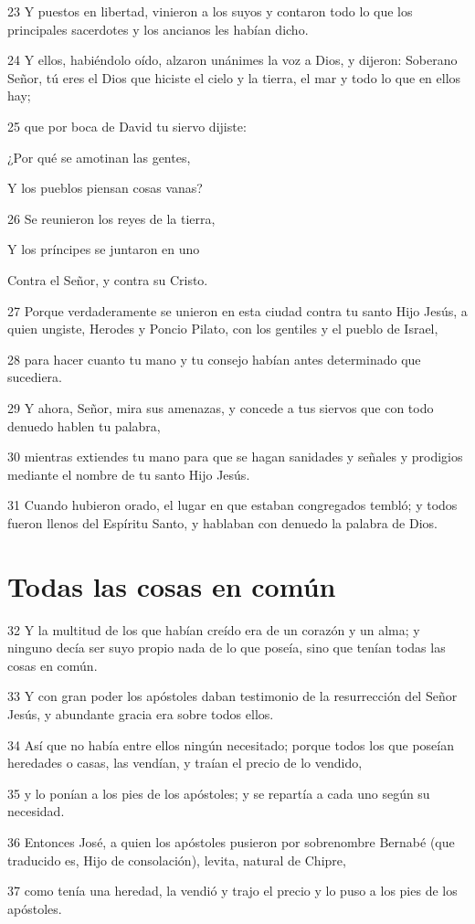 \par 23 Y puestos en libertad, vinieron a los suyos y contaron todo lo que los principales sacerdotes y los ancianos les habían dicho.
\par 24 Y ellos, habiéndolo oído, alzaron unánimes la voz a Dios, y dijeron: Soberano Señor, tú eres el Dios que hiciste el cielo y la tierra, el mar y todo lo que en ellos hay;
\par 25 que por boca de David tu siervo dijiste:
\par ¿Por qué se amotinan las gentes,
\par Y los pueblos piensan cosas vanas?
\par 26 Se reunieron los reyes de la tierra,
\par Y los príncipes se juntaron en uno
\par Contra el Señor, y contra su Cristo.
\par 27 Porque verdaderamente se unieron en esta ciudad contra tu santo Hijo Jesús, a quien ungiste, Herodes y Poncio Pilato, con los gentiles y el pueblo de Israel,
\par 28 para hacer cuanto tu mano y tu consejo habían antes determinado que sucediera.
\par 29 Y ahora, Señor, mira sus amenazas, y concede a tus siervos que con todo denuedo hablen tu palabra,
\par 30 mientras extiendes tu mano para que se hagan sanidades y señales y prodigios mediante el nombre de tu santo Hijo Jesús.
\par 31 Cuando hubieron orado, el lugar en que estaban congregados tembló; y todos fueron llenos del Espíritu Santo, y hablaban con denuedo la palabra de Dios.

\section*{Todas las cosas en común}

\par 32 Y la multitud de los que habían creído era de un corazón y un alma; y ninguno decía ser suyo propio nada de lo que poseía, sino que tenían todas las cosas en común.
\par 33 Y con gran poder los apóstoles daban testimonio de la resurrección del Señor Jesús, y abundante gracia era sobre todos ellos.
\par 34 Así que no había entre ellos ningún necesitado; porque todos los que poseían heredades o casas, las vendían, y traían el precio de lo vendido,
\par 35 y lo ponían a los pies de los apóstoles; y se repartía a cada uno según su necesidad.
\par 36 Entonces José, a quien los apóstoles pusieron por sobrenombre Bernabé (que traducido es, Hijo de consolación), levita, natural de Chipre,
\par 37 como tenía una heredad, la vendió y trajo el precio y lo puso a los pies de los apóstoles.

